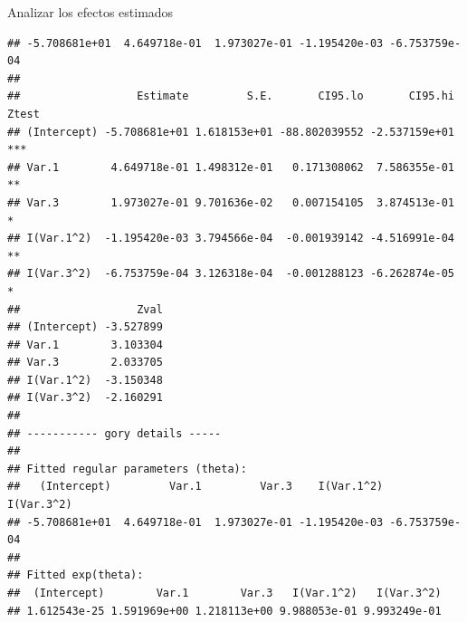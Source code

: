 \documentclass[
  11pt,
  ignorenonframetext,
]{beamer}
\begin{document}
\begin{frame}[fragile]{Analizar los efectos estimados}
\begin{verbatim}
## -5.708681e+01  4.649718e-01  1.973027e-01 -1.195420e-03 -6.753759e-04 
## 
##                  Estimate         S.E.       CI95.lo       CI95.hi Ztest
## (Intercept) -5.708681e+01 1.618153e+01 -88.802039552 -2.537159e+01   ***
## Var.1        4.649718e-01 1.498312e-01   0.171308062  7.586355e-01    **
## Var.3        1.973027e-01 9.701636e-02   0.007154105  3.874513e-01     *
## I(Var.1^2)  -1.195420e-03 3.794566e-04  -0.001939142 -4.516991e-04    **
## I(Var.3^2)  -6.753759e-04 3.126318e-04  -0.001288123 -6.262874e-05     *
##                  Zval
## (Intercept) -3.527899
## Var.1        3.103304
## Var.3        2.033705
## I(Var.1^2)  -3.150348
## I(Var.3^2)  -2.160291
## 
## ----------- gory details -----
## 
## Fitted regular parameters (theta):
##   (Intercept)         Var.1         Var.3    I(Var.1^2)    I(Var.3^2) 
## -5.708681e+01  4.649718e-01  1.973027e-01 -1.195420e-03 -6.753759e-04 
## 
## Fitted exp(theta):
##  (Intercept)        Var.1        Var.3   I(Var.1^2)   I(Var.3^2) 
## 1.612543e-25 1.591969e+00 1.218113e+00 9.988053e-01 9.993249e-01
\end{verbatim}
\end{frame}
\end{document}
